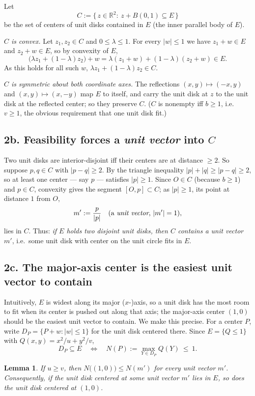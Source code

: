 \documentclass[11pt]{article}
\newtheorem{lemma}{Lemma}
\newcommand{\R}{\mathbb{R}}
\begin{document}
Let
\[
  C:=\{\,z\in\R^2:\ z+B(0,1)\subseteq E\,\}
\]
be the set of centers of unit disks contained in $E$ (the inner parallel body of $E$).

\emph{$C$ is convex.} Let $z_1,z_2\in C$ and $0\le\lambda\le1$. For every $|w|\le1$ we have
$z_1+w\in E$ and $z_2+w\in E$, so by convexity of $E$,
\[
  \bigl(\lambda z_1+(1-\lambda)z_2\bigr)+w
   =\lambda(z_1+w)+(1-\lambda)(z_2+w)\in E .
\]
As this holds for all such $w$, $\lambda z_1+(1-\lambda)z_2\in C$.

\emph{$C$ is symmetric about both coordinate axes.} The reflections $(x,y)\mapsto(-x,y)$ and
$(x,y)\mapsto(x,-y)$ map $E$ to itself, and carry the unit disk at $z$ to the unit disk at the
reflected center; so they preserve $C$. ($C$ is nonempty iff $b\ge1$, i.e.\ $v\ge1$, the obvious
requirement that one unit disk fit.)

\subsection*{2b. Feasibility forces a \emph{unit vector} into $C$}

Two unit disks are interior-disjoint iff their centers are at distance $\ge2$. So suppose
$p,q\in C$ with $|p-q|\ge2$. By the triangle inequality $|p|+|q|\ge|p-q|\ge2$, so at least one
center --- say $p$ --- satisfies $|p|\ge1$. Since $O\in C$ (because $b\ge1$) and $p\in C$, convexity
gives the segment $[O,p]\subset C$; as $|p|\ge1$, its point at distance $1$ from $O$,
\[
m':=\frac{p}{|p|}\quad(\text{a \emph{unit vector}, }|m'|=1),
\]
lies in $C$. Thus: \emph{if $E$ holds two disjoint unit disks, then $C$ contains a
unit vector $m'$}, i.e.\ some unit disk with center on the unit circle fits in $E$.

\subsection*{2c. The major-axis center is the easiest unit vector to contain}

Intuitively, $E$ is widest along its major ($x$-)axis, so a unit disk has the most room to fit when
its center is pushed out along that axis; the major-axis center $(1,0)$ should be the easiest unit
vector to contain. We make this precise. For a center $P$, write $D_P=\{P+w:|w|\le1\}$ for the unit
disk centered there. Since $E=\{Q\le1\}$ with $Q(x,y)=x^2/u+y^2/v$,
\[
  D_P\subseteq E\quad\iff\quad N(P):=\max_{Y\in D_P}Q(Y)\ \le\ 1 .
\]

\begin{lemma}\label{lem:major}
If $u\ge v$, then $N\bigl((1,0)\bigr)\le N(m')$ for every unit vector $m'$. Consequently, if the
unit disk centered at some unit vector $m'$ lies in $E$, so does the unit disk centered at $(1,0)$.
\end{lemma}
\end{document}

